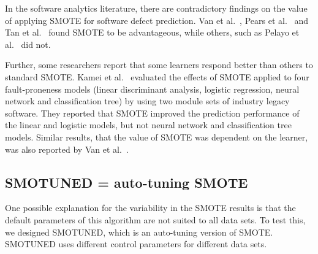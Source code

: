 \documentclass[sigconf,review, anonymous]{acmart}
\theoremstyle{break}
\theoremstyle{break}
\newcommand{\sma}{{\sc SMOTE}}
\newcommand{\smb}{{\sc SMOTUNED}}
\begin{document}


In the software analytics literature, there are contradictory findings on
the value of applying SMOTE for software defect prediction.
Van et al.~\cite{van2007experimental}, Pears et al.~\cite{pears2014synthetic} and Tan et al.~\cite{tan2015online} found SMOTE to be advantageous, while others, such as Pelayo et al.~\cite{pelayo2007applying} did not. 

Further, some researchers report that some learners respond better than others to standard SMOTE. Kamei et al.~\cite{kamei2007effects} evaluated the effects of SMOTE applied to  four fault-proneness models
(linear discriminant analysis, logistic regression, neural network and classification tree) by
using two module sets of industry legacy software. They reported that SMOTE improved the prediction performance of the linear and logistic models, but not neural network and classification tree models. Similar results, that the value of SMOTE was dependent on the learner,
was also reported by Van et al.~\cite{van2007experimental}.

\subsection{SMOTUNED = auto-tuning SMOTE}
\label{sect:smotuned}

One possible explanation for the variability in the {\sma} results is that the
default parameters of this algorithm are not suited to all data sets. To test this,
we designed {\smb}, which is an auto-tuning version of {\sma}. {\smb}
uses different control parameters for different data sets.
\end{document}
